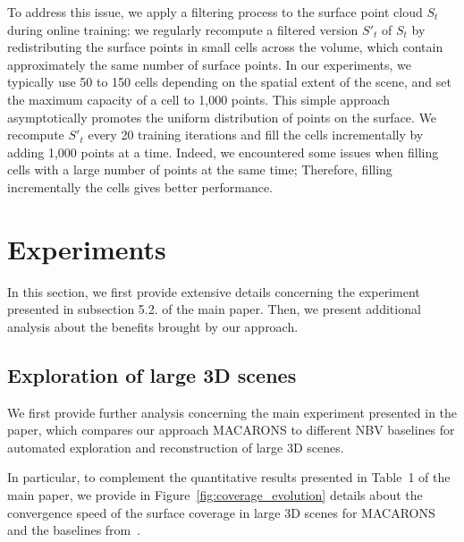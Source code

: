 To address this issue, we apply a filtering process to the surface point cloud $S_t$ during online training: we regularly recompute a filtered version $S'_t$ of $S_t$ by redistributing the surface points in small cells across the volume, which contain approximately the same number of surface points. In our experiments, we typically use 50 to 150 cells depending on the spatial extent of the scene, and set the maximum capacity of a cell to 1,000 points.
%
This simple approach asymptotically promotes the uniform distribution of points on the surface. We recompute $S'_t$ every 20 training iterations and fill the cells incrementally by adding 1,000 points at a time. Indeed, we encountered some issues when filling cells with a large number of points at the same time; Therefore, filling incrementally the cells gives better performance.

\section{Experiments}

In this section, we first provide extensive details concerning the experiment presented in subsection 5.2. of the main paper. Then, we present additional analysis about the benefits brought by our approach.

\subsection{Exploration of large 3D scenes}
% 

We first provide further analysis concerning the main experiment presented in the paper, which compares our approach MACARONS to different NBV baselines for automated exploration and reconstruction of large 3D scenes. 

In particular, to complement the quantitative results presented in Table~1 of the main paper, we provide in Figure~\ref{fig:coverage_evolution} details about the convergence speed of the surface coverage in large 3D scenes for MACARONS and the baselines from~\cite{guedon-nips22-scone-surface-coverage}.
%

% 
%
%

